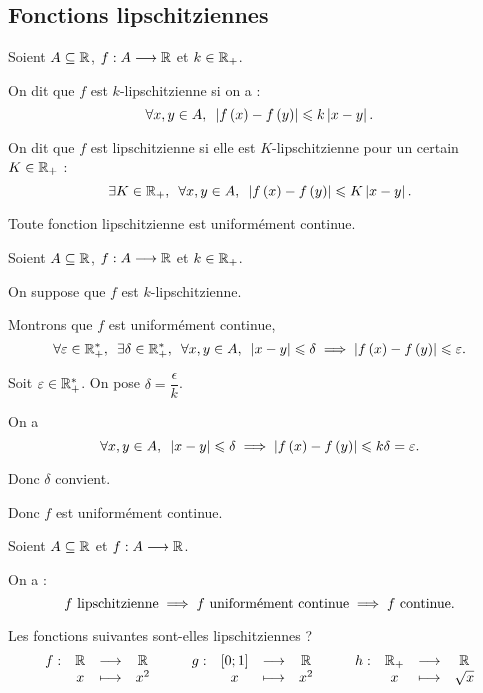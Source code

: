 \subsection{Fonctions lipschitziennes}

\begin{defi}
Soient \(A\subseteq\mathbb{R}\), \(f:A\longrightarrow\mathbb{R}\) et \(k\in\mathbb{R}_+\).

On dit que \(f\) est \(k\)-lipschitzienne si on a : \[\quantifs{\forall x,y\in A}\abs{f\paren{x}-f\paren{y}}\leq k\abs{x-y}.\]

On dit que \(f\) est lipschitzienne si elle est \(K\)-lipschitzienne pour un certain \(K\in\mathbb{R}_+\) : \[\quantifs{\exists K\in\Rp;\forall x,y\in A}\abs{f\paren{x}-f\paren{y}}\leq K\abs{x-y}.\]
\end{defi}

\begin{prop}
Toute fonction lipschitzienne est uniformément continue.
\end{prop}

\begin{dem}
Soient \(A\subseteq\mathbb{R}\), \(f:A\longrightarrow\mathbb{R}\) et \(k\in\mathbb{R}_+\).

On suppose que \(f\) est \(k\)-lipschitzienne.

Montrons que \(f\) est uniformément continue, \cad \[\quantifs{\forall\epsilon\in\Rps;\exists\delta\in\Rps;\forall x,y\in A}\abs{x-y}\leq\delta\imp\abs{f\paren{x}-f\paren{y}}\leq\epsilon.\]

Soit \(\varepsilon\in\mathbb{R}_+^*\). On pose \(\delta=\dfrac{\epsilon}{k}\).

On a \[\quantifs{\forall x,y\in A}\abs{x-y}\leq\delta\imp\abs{f\paren{x}-f\paren{y}}\leq k\delta=\epsilon.\]

Donc \(\delta\) convient.

Donc \(f\) est uniformément continue.
\end{dem}

\begin{bilan}
Soient \(A\subseteq\mathbb{R}\) et \(f:A\longrightarrow\mathbb{R}\).

On a : \[f\text{ lipschitzienne}\implies f\text{ uniformément continue}\implies f\text{ continue}.\]
\end{bilan}

\begin{exo}
Les fonctions suivantes sont-elles lipschitziennes ? \[\begin{array}[t]{cccc}f : & \mathbb{R} & \longrightarrow & \mathbb{R} \\ & x & \longmapsto & x^2\end{array}\qquad\begin{array}[t]{cccc}g : & \left[0;1\right] & \longrightarrow & \mathbb{R} \\ & x & \longmapsto & x^2\end{array}\qquad\begin{array}[t]{cccc}h : & \mathbb{R}_+ & \longrightarrow & \mathbb{R} \\ & x & \longmapsto & \sqrt{x}\end{array}\]
\end{exo}

